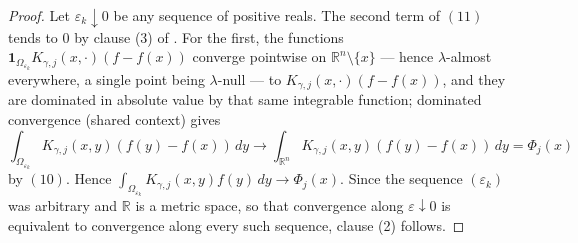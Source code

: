 \begin{proof}
Let $\varepsilon_k\downarrow0$ be any sequence of positive reals.  The second
term of $(11)$ tends to $0$ by clause (3) of
.  For the first, the functions
$\mathbf 1_{\Omega_{\varepsilon_k}}K_{\gamma,j}(x,\cdot)(f-f(x))$ converge
pointwise on $\mathbb{R}^n\setminus\{x\}$ --- hence $\lambda$-almost everywhere,
a single point being $\lambda$-null --- to
$K_{\gamma,j}(x,\cdot)(f-f(x))$, and they are dominated in absolute value by
that same integrable function; dominated convergence (shared context) gives
\[
  \int_{\Omega_{\varepsilon_k}}K_{\gamma,j}(x,y)(f(y)-f(x))\,dy
    \longrightarrow
  \int_{\mathbb{R}^n}K_{\gamma,j}(x,y)(f(y)-f(x))\,dy = \Phi_j(x)
\]
by $(10)$.  Hence
$\int_{\Omega_{\varepsilon_k}}K_{\gamma,j}(x,y)f(y)\,dy \to \Phi_j(x)$.  Since
the sequence $(\varepsilon_k)$ was arbitrary and $\mathbb{R}$ is a metric space,
so that convergence along $\varepsilon\downarrow0$ is equivalent to convergence
along every such sequence, clause (2) follows.
\end{proof}
